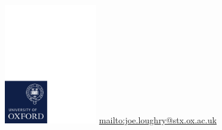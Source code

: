 \documentclass{beamer}
\begin{document}
\begin{frame}
	\begin{center}
		\vspace{1cm}
		\includegraphics[width=0.3\textwidth,trim=0 0 117mm 183mm,clip]{graphics/ox_brand_cmyk_pos.pdf}
		\vfill
		\url{mailto:joe.loughry@stx.ox.ac.uk}
	\end{center}
\end{frame}
\end{document}
